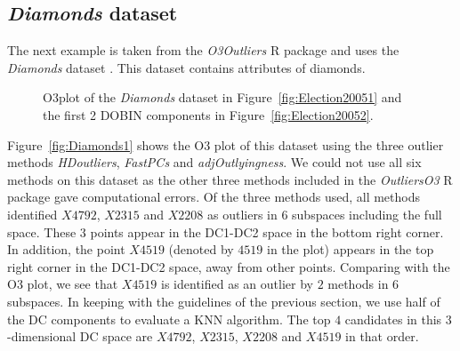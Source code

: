 \documentclass[letter,12pt]{article}
\begin{document}
\subsection{\textit{Diamonds} dataset}\label{sec:ResWithVis2}

The next example is taken from the \textit{O3Outliers} R package \citep{O3Rpack} and uses the \textit{Diamonds} dataset \citep{ggplot2}. This dataset contains attributes of diamonds.

\begin{figure}[!ht]
	\centering
	\hfill
	\caption{O3plot of the \textit{Diamonds} dataset in Figure~\ref{fig:Election20051} and the first 2 DOBIN components in Figure~\ref{fig:Election20052}.}
	\label{fig:Diamonds}
\end{figure}

Figure~\ref{fig:Diamonds1} shows the O3 plot of this dataset using the three outlier methods \textit{HDoutliers}, \textit{FastPCs} and \textit{adjOutlyingness}. We could not use all six methods on this dataset as the other three methods included in the \textit{OutliersO3} R package gave computational errors. Of the three methods used, all methods identified $X4792$, $X2315$ and $X2208$ as outliers in 6 subspaces including the full space. These $3$ points appear in the DC1-DC2 space in the bottom right corner. In addition, the point $X4519$ (denoted by $4519$ in the plot) appears in the top right corner in the DC1-DC2 space, away from other points. Comparing with the O3 plot, we see that $X4519$ is identified as an outlier by $2$ methods in $6$ subspaces. In keeping with the guidelines of the previous section, we use half of the DC components to evaluate a KNN algorithm. The top $4$ candidates in this $3$-dimensional DC space are $X4792$, $X2315$, $X2208$ and $X4519$ in that order.
\end{document}

